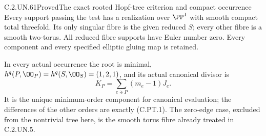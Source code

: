 \begin{statement}{C.2.UN.61}{Proved}{The exact rooted Hopf-tree criterion and compact occurrence}
Every support passing the test has a realization over $\PP^1$
with smooth compact total threefold. Its only singular fibre
is the given reduced $S$; every other fibre is a smooth
two-torus. All reduced fibre supports have Euler number zero.
Every component and every specified elliptic gluing map is
retained.

In every actual occurrence the root is minimal,
$h^q(P,\OO_P)=h^q(S,\OO_S)=(1,2,1)$, and its actual canonical
divisor is
\[
                 K_P=\sum_{e\ni P}(m_e-1)J_e.
                 \tag{C.PT.2}
\]
It is the unique minimum-order component for canonical evaluation;
the differences of the other orders are exactly (C.PT.1).
The zero-edge case, excluded from the nontrivial tree here,
is the smooth torus fibre already treated in C.2.UN.5.
\end{statement}

